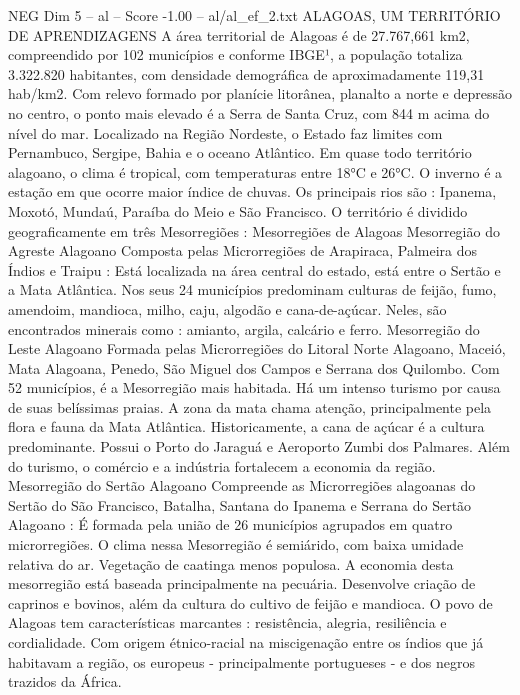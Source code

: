 \begin{textsample}{NEG Dim 5 – al – Score -1.00 – al/al\_ef\_2.txt}  \label{ex:f5_neg_241}
ALAGOAS, UM TERRITÓRIO DE APRENDIZAGENS A área territorial de Alagoas é de 27.767,661 km2, compreendido por 102 municípios e conforme IBGE¹, a população totaliza 3.322.820 habitantes, com densidade demográfica de aproximadamente 119,31 hab/km2.
Com relevo formado por planície litorânea, planalto a norte e depressão no centro, o ponto mais elevado é a Serra de Santa Cruz, com 844 m acima do nível do mar.
Localizado na Região Nordeste, o Estado faz limites com Pernambuco, Sergipe, Bahia e o oceano Atlântico.
Em quase todo território alagoano, o clima é tropical, com temperaturas entre 18{\EmojiFont °}C e 26{\EmojiFont °}C.
O inverno é a estação em que ocorre maior índice de chuvas.
Os principais rios são : Ipanema, Moxotó, Mundaú, Paraíba do Meio e São Francisco.
O território é dividido geograficamente em três Mesorregiões : Mesorregiões de Alagoas Mesorregião do Agreste Alagoano Composta pelas Microrregiões de Arapiraca, Palmeira dos Índios e Traipu : Está localizada na área central do estado, está entre o Sertão e a Mata Atlântica.
Nos seus 24 municípios predominam culturas de feijão, fumo, amendoim, mandioca, milho, caju, algodão e cana-de-açúcar.
Neles, são encontrados minerais como : amianto, argila, calcário e ferro.
Mesorregião do Leste Alagoano Formada pelas Microrregiões do Litoral Norte Alagoano, Maceió, Mata Alagoana, Penedo, São Miguel dos Campos e Serrana dos Quilombo.
Com 52 municípios, é a Mesorregião mais habitada.
Há um intenso turismo por causa de suas belíssimas praias.
A zona da mata chama atenção, principalmente pela flora e fauna da Mata Atlântica.
Historicamente, a cana de açúcar é a cultura predominante.
Possui o Porto do Jaraguá e Aeroporto Zumbi dos Palmares.
Além do turismo, o comércio e a indústria fortalecem a economia da região.
Mesorregião do Sertão Alagoano Compreende as Microrregiões alagoanas do Sertão do São Francisco, Batalha, Santana do Ipanema e Serrana do Sertão Alagoano : É formada pela união de 26 municípios agrupados em quatro microrregiões.
O clima nessa Mesorregião é semiárido, com baixa umidade relativa do ar.
Vegetação de caatinga menos populosa.
A economia desta mesorregião está baseada principalmente na pecuária.
Desenvolve criação de caprinos e bovinos, além da cultura do cultivo de feijão e mandioca.
O povo de Alagoas tem características marcantes : resistência, alegria, resiliência e cordialidade.
Com origem étnico-racial na miscigenação entre os índios que já habitavam a região, os europeus - principalmente portugueses - e dos negros trazidos da África.

\end{textsample}
